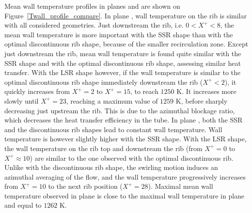 Mean wall temperature profiles in planes  and  are shown on Figure~\ref{Twall_profile_compare}. In plane , wall temperature on the rib is similar with all considered geometries. Just downstream the rib, i.e. $0<X^+<8$, the mean wall temperature is more important with the SSR shape than with the optimal discontinuous rib shape, because of the smaller recirculation zone. Except just downstream the rib, mean wall temperature is found quite similar with the SSR shape and with the optimal discontinuous rib shape, assessing similar heat transfer. With the LSR shape however, if the wall temperature is similar to the optimal discontinuous rib shape immediately downstream the rib ($X^+<2$), it quickly increases from $X^+=2$ to $X^+=15$, to reach $1250$ K. It increases more slowly until $X^+=23$, reaching a maximum value of $1259$ K, before sharply decreasing just upstream the rib. This is due to the azimuthal blockage ratio, which decreases the heat transfer efficiency in the tube. In plane , both the SSR and the discontinuous rib shapes lead to constant wall temperature. Wall temperature is however slightly higher with the SSR shape. With the LSR shape, the wall temperature on the rib top and downstream the rib (from $X^+=0$ to $X^+ \approx 10$) are similar to the one observed with the optimal discontinuous rib. Unlike with the discontinuous rib shape, the swirling motion induces an azimuthal averaging of the flow, and the wall temperature progressively increases from $X^+=10$ to the next rib position ($X^+=28$). Maximal mean wall temperature observed in plane  is close to the maximal wall temperature in plane  and equal to $1262$ K.\\


